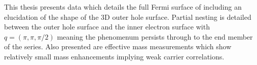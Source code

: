 This thesis presents data which details the full Fermi surface of \BaFeP including an elucidation of the shape of the 3D outer hole surface. Partial nesting is detailed between the outer hole surface and the inner electron surface with $q=(\pi, \pi, \pi/2)$ meaning the phenomenum persists through to the end member of the series. Also presented are effective mass measurements which show relatively small mass enhancements implying weak carrier correlations.
